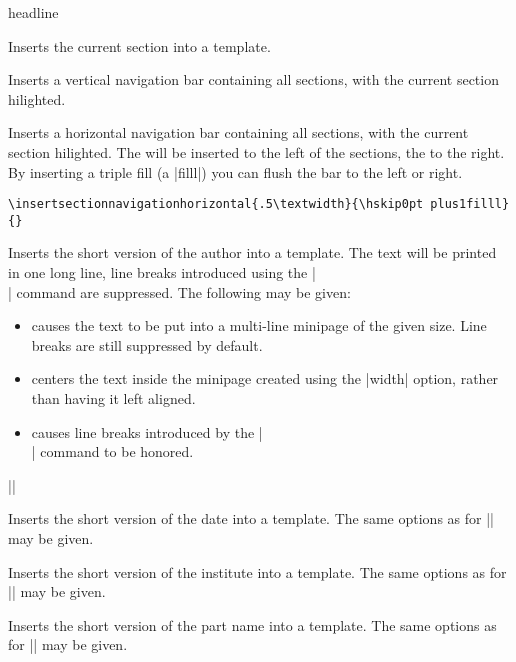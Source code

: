 \begin{element}{headline}
\begin{itemize}
    \iteminsert{\insertsection}
    Inserts the current section into a template.

    \iteminsert{\insertsectionnavigation}
    Inserts a vertical navigation bar containing all sections, with the
    current section hilighted.

    \iteminsert{\insertsectionnavigationhorizontal}
    Inserts a horizontal navigation bar containing all sections, with
    the current section hilighted. The  will be
    inserted to the left of the sections, the  to the
    right. By inserting a triple fill (a
    |filll|) you can flush the bar to the left or right.
    \example
\begin{verbatim}
\insertsectionnavigationhorizontal{.5\textwidth}{\hskip0pt plus1filll}{}
\end{verbatim}

    \iteminsert{\insertshortauthor}
    Inserts the short version of the author into a template. The text
    will be printed in one long line, line breaks introduced using the
    |\\| command are suppressed.  The
    following  may be given:
    \begin{itemize}
    \item
      causes the text to be put into a multi-line minipage of the given
      size. Line breaks are still suppressed by default.
    \item
      centers the text inside the minipage created using the |width|
      option, rather than having it left aligned.
    \item
      causes line breaks introduced by the |\\| command to be honored.    
    \end{itemize}

    \example |\insertauthor[width={3cm},center,respectlinebreaks]|

    \iteminsert{\insertshortdate}
    Inserts the short version of the date into a template. The same
    options as for |\insertshortauthor| may be given. 

    \iteminsert{\insertshortinstitute}
    Inserts the short version of the institute into a template. The same
    options as for |\insertshortauthor| may be given. 

    \iteminsert{\insertshortpart}
    Inserts the short version of the part name into a template. The same
    options as for |\insertshortauthor| may be given. 


\end{itemize}
\end{element}

